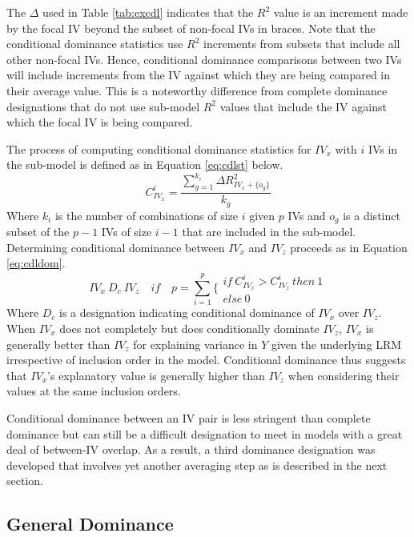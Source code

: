 \documentclass[man]{apa7}
\begin{document}
	The $\Delta$ used in Table \ref{tab:excdl} indicates that the $R^2$ value is an increment made by the focal IV beyond the subset of non-focal IVs in braces.
	Note that the conditional dominance statistics use $R^2$ increments from subsets that include all other non-focal IVs.
	Hence, conditional dominance comparisons between two IVs will include increments from the IV against which they are being compared in their average value.
	This is a noteworthy difference from complete dominance designations that do not use sub-model $R^2$ values that include the IV against which the focal IV is being compared.
	
	The process of computing conditional dominance statistics for $IV_x$ with $i$ IVs in the sub-model is defined as in Equation \ref{eq:cdlst} below.
	\begin{equation}
		C^{i}_{IV_x} = \frac{\sum^{k_i}_{g=1} \Delta R^2_{IV_x + \{o_g\}}}{k_g}
		\label{eq:cdlst}
	\end{equation}
	Where $k_i$ is the number of combinations of size $i$ given $p$ IVs and $o_g$ is a distinct subset of the $p - 1$ IVs of size $i - 1$ that are included in the sub-model.	
	Determining conditional dominance between $IV_x$ and $IV_z$ proceeds as in Equation \ref{eq:cdldom}.
	\begin{equation}
		IV_x \ D_c \ IV_z \quad if \quad p = \sum^p_{i=1} \Biggl\{ 
		\begin{array}{l}
			if \ C^{i}_{IV_x} > C^{i}_{IV_z} \ then \ 1 \\ 
			else \ 0 
		\end{array}
		\label{eq:cdldom}
	\end{equation}
	Where $D_c$ is a designation indicating conditional dominance of $IV_x$ over $IV_z$.	
	When $IV_x$ does not completely but does conditionally dominate $IV_z$, $IV_x$ is generally better than $IV_z$ for explaining variance in $Y$ given the underlying LRM irrespective of inclusion order in the model.
	Conditional dominance thus suggests that $IV_x$'s explanatory value is generally higher than $IV_z$ when considering their values at the same inclusion orders.
	
	Conditional dominance between an IV pair is less stringent than complete dominance but can still be a difficult designation to meet in models with a great deal of between-IV overlap.
	As a result, a third dominance designation was developed that involves yet another averaging step as is described in the next section.
	
	\subsection{General Dominance}
	
\end{document}
